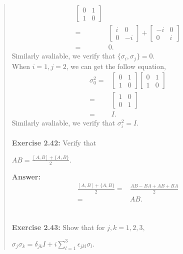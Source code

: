 \documentclass[UTF8]{ctexart}
\begin{document}
\begin{quote}
\begin{equation}
\begin{aligned}
\begin{bmatrix}
					0 & 1 \\
					1 & 0	
					\end{bmatrix}
					\\
					=&\begin{bmatrix}
						i & 0 \\
						0 & -i	
						\end{bmatrix}
						+
						\begin{bmatrix}
							-i & 0 \\
							0 & i	
							\end{bmatrix}
							\\
					=&0.
	\end{aligned}
	\end{equation}
	Similarly avaliable, we verify that $\{\sigma_{i},\sigma_{j}\} = 0$.
\\
When $i=1, j=2$, we can get the follow equation,
\begin{equation}
	\begin{aligned}
		\sigma_{0}^{2}=&
			\begin{bmatrix}
				0 & 1 \\
				1 & 0	
				\end{bmatrix}
				\begin{bmatrix}
					0 & 1 \\
					1 & 0	
					\end{bmatrix}
					\\
					=&\begin{bmatrix}
						1 & 0 \\
						0 & 1	
						\end{bmatrix}
					\\
					=&I.
	\end{aligned}
	\end{equation}
	Similarly avaliable, we verify that $\sigma_{i}^{2} = I$.
	\\
	\\
\textbf{Exercise 2.42:  } Verify that
\begin{center}
	$AB=\frac{[A,B] + \{A,B\} }{2}$.
\end{center}
\textbf{Answer:}\\
\begin{equation}
	\begin{aligned}
\frac{[A,B] + \{A,B\} }{2}=&\frac{AB-BA + AB+BA }{2}\\
						  =&AB.
	\end{aligned}
	\end{equation}
\\
\\
\textbf{Exercise 2.43:} Show that for $j,k = 1,2,3,$
\begin{center}
$\sigma_{j}\sigma_{k}=\delta_{jk}I+i\sum_{l=1}^{3}\epsilon_{jkl}\sigma_{l}.$
\end{center}


\end{quote}
\end{document}
